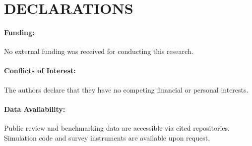 \documentclass[11pt,a4paper]{article}
\begin{document}
\section*{DECLARATIONS}
\paragraph{Funding:} No external funding was received for conducting this research.
\paragraph{Conflicts of Interest:} The authors declare that they have no competing financial or personal interests.
\paragraph{Data Availability:} Public review and benchmarking data are accessible via cited repositories. Simulation code and survey instruments are available upon request.
\end{document}
